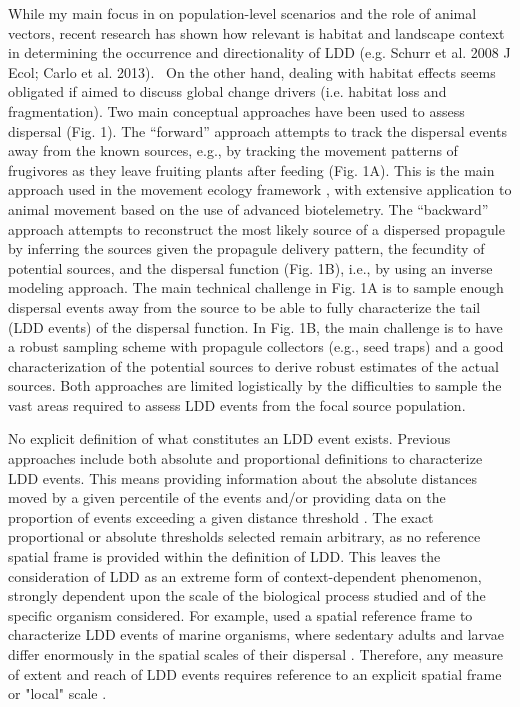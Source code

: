 \documentclass[a4paper, 12pt]{article}
\begin{document}
\begin{linenumbers}
While my main focus in on population-level scenarios and the role of animal vectors, recent research has shown how relevant is habitat and landscape context in determining the occurrence and directionality of LDD (e.g. Schurr et al. 2008 J Ecol; Carlo et al. 2013).  On the other hand, dealing with habitat effects seems obligated if aimed to discuss global change drivers (i.e. habitat loss and fragmentation). Two main conceptual approaches have been used to assess dispersal (Fig. 1). The “forward” approach attempts to track the dispersal events away from the known sources, e.g., by tracking the movement patterns of frugivores as they leave fruiting plants after feeding (Fig. 1A). This is the main approach used in the movement ecology framework \citep{Nathan:2008fx}, with extensive application to animal movement based on the use of advanced biotelemetry. The “backward” approach attempts to reconstruct the most likely source of a dispersed propagule by inferring the sources given the propagule delivery pattern, the fecundity of potential sources, and the dispersal function (Fig. 1B), i.e., by using an inverse modeling approach. The main technical challenge in Fig. 1A is to sample enough dispersal events away from the source to be able to fully characterize the tail (LDD events) of the dispersal function. In Fig. 1B, the main challenge is to have a robust sampling scheme with propagule collectors (e.g., seed traps) and a good characterization of the potential sources to derive robust estimates of the actual sources. Both approaches are limited logistically by the difficulties to sample the vast areas required to assess LDD events from the focal source population.    

No explicit definition of what constitutes an LDD event exists. Previous approaches \citep[e.g., ][]{Nathan:2006aa,Schurr2009long} include both absolute and proportional definitions to characterize LDD events. This means providing information about the absolute distances moved by a given percentile of the events and/or providing data on the proportion of events exceeding a given distance threshold \citep{Nathan:2008is}. The exact proportional or absolute thresholds selected remain arbitrary, as no reference spatial frame is provided within the definition of LDD. This leaves the consideration of LDD as an extreme form of context-dependent phenomenon, strongly dependent upon the scale of the biological process studied \citep{Kinlan:2005fb} and of the specific organism considered. For example, \cite{Kinlan:2005fb} used a spatial reference frame to characterize LDD events of marine organisms, where sedentary adults and larvae differ enormously in the spatial scales of their dispersal \citep{DAloia:2013fc}. Therefore, any measure of extent and reach of LDD events requires reference to an explicit spatial frame or "local" scale \citep{Kinlan:2005fb}.


\end{linenumbers}
\end{document}
